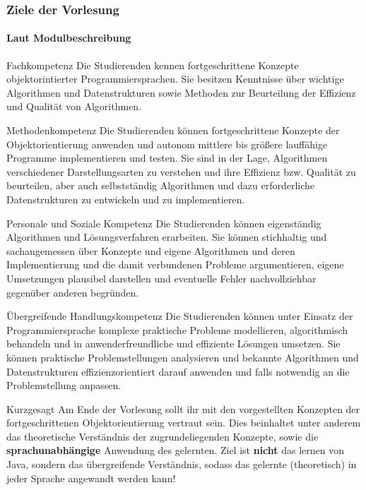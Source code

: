 \begin{frame}[allowframebreaks]
	\frametitle{Ziele der Vorlesung}
	\framesubtitle{Laut Modulbeschreibung}
	
	\vfill
	\begin{block}{Fachkompetenz}
		Die Studierenden kennen fortgeschrittene Konzepte objektorintierter Programmiersprachen. Sie besitzen Kenntnisse über wichtige Algorithmen und Datenstrukturen sowie Methoden
		zur Beurteilung der Effizienz und Qualität von Algorithmen.
	\end{block}
	\vfill
	
	\framebreak
	
	\vfill
	\begin{block}{Methodenkompetenz}
		Die Studierenden können fortgeschrittene Konzepte der Objektorientierung anwenden und autonom mittlere bis größere lauffähige Programme implementieren und testen. Sie sind in der Lage, Algorithmen verschiedener Darstellungsarten zu 
		verstehen und ihre Effizienz bzw. Qualität zu beurteilen, aber auch selbstständig Algorithmen und dazu erforderliche Datenstrukturen zu entwickeln und zu implementieren.
	\end{block}
	\vfill
	
	\framebreak
	
	\vfill
	\begin{block}{Personale und Soziale Kompetenz}
		Die Studierenden können eigenständig Algorithmen und Lösungsverfahren erarbeiten. Sie können stichhaltig und sachangemessen über Konzepte und eigene Algorithmen und deren Implementierung 
		und die damit verbundenen Probleme argumentieren, eigene Umsetzungen plausibel darstellen und eventuelle Fehler nachvollziehbar gegenüber anderen begründen.
	\end{block}
	\vfill
	
	\framebreak
	
	\vfill
	\begin{block}{Übergreifende Handlungskompetenz}
		Die Studierenden können unter Einsatz der Programmiersprache komplexe praktische Probleme modellieren, algorithmisch behandeln und in anwenderfreundliche und effiziente Lösungen umsetzen. Sie 
		können praktische Problemstellungen analysieren und bekannte Algorithmen und Datenstrukturen effizienzorientiert darauf anwenden und falls notwendig an die Problemstellung anpassen.
	\end{block}
	\vfill
	
	\framebreak
	
	\vfill
	\begin{alertblock}{Kurzgesagt}
		Am Ende der Vorlesung sollt ihr mit den vorgestellten Konzepten der fortgeschrittenen Objektorientierung vertraut sein. Dies beinhaltet unter anderem das theoretische Verständnis der zugrundeliegenden Konzepte,
		sowie die \textbf{sprachunabhängige} Anwendung des gelernten. Ziel ist \textbf{nicht} das lernen von Java, sondern das übergreifende Verständnis, sodass das gelernte (theoretisch) in jeder Sprache angewandt werden kann!
	\end{alertblock}
	\vfill
\end{frame}

